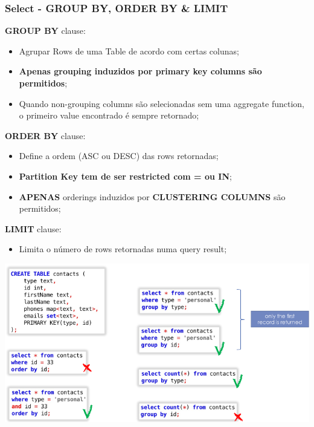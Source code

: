 \documentclass{article}
\begin{document}
\pagebreak

\subsubsection{Select - GROUP BY, ORDER BY \& LIMIT}

\begin{flushleft}
  \textbf{GROUP BY} clause:
  \begin{itemize}
    \item Agrupar Rows de uma Table de acordo com certas colunas;
    \item \textbf{Apenas grouping induzidos por primary key columns são permitidos};
    \item Quando non-grouping columns são selecionadas sem uma aggregate function,
    o primeiro value encontrado é sempre retornado;
  \end{itemize}

  \vspace{2mm}

  \textbf{ORDER BY} clause:
  \begin{itemize}
    \item Define a ordem (ASC ou DESC) das rows retornadas;
    \item \textbf{Partition Key tem de ser restricted com = ou IN};
    \item \textbf{APENAS} orderings induzidos por \textbf{CLUSTERING COLUMNS} são permitidos;
  \end{itemize}

  \vspace{2mm}

  \textbf{LIMIT} clause:
  \begin{itemize}
    \item Limita o número de rows retornadas numa query result;
  \end{itemize}

  \begin{center}
    \includegraphics[scale=0.3]{32}
  \end{center}
\end{flushleft}
\end{document}
